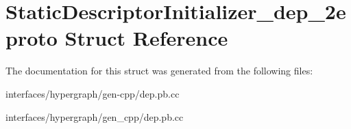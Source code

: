 \hypertarget{structStaticDescriptorInitializer__dep__2eproto}{
\section{StaticDescriptorInitializer\_\-dep\_\-2eproto Struct Reference}
\label{structStaticDescriptorInitializer__dep__2eproto}
}


The documentation for this struct was generated from the following files:\begin{DoxyCompactItemize}
\item 
interfaces/hypergraph/gen-\/cpp/dep.pb.cc\item 
interfaces/hypergraph/gen\_\-cpp/dep.pb.cc\end{DoxyCompactItemize}
